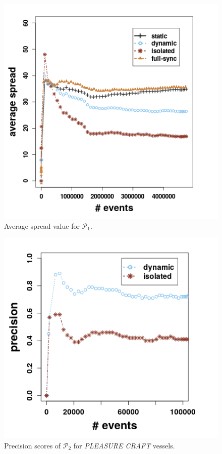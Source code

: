 \begin{center}
	
	\begin{figure}[]
		
		\includegraphics[width=\textwidth]{chapters/figures/spread_p1.png}
		
		\caption{Average spread value for $\mathcal{P}_1$.}
		\label{fig:spread}
	\end{figure}
\end{center}

 \begin{figure}[]
	
	\includegraphics[width=\textwidth]{chapters/figures/precision_p2.png}
	
	\caption{Precision scores of $\mathcal{P}_2$  for \textit{PLEASURE CRAFT} vessels.}
	\label{fig:precsions_p2}
\end{figure}


